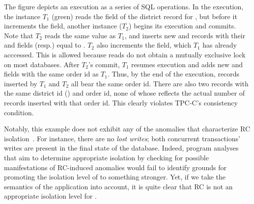 
The figure depicts an execution as a series of SQL 
operations. In the execution, the  instance
$T_1$ (green) reads the  field of the district
record for , but before it increments the field, another
 instance ($T_2$) begins its execution and commits. Note
that $T_2$ reads the same  value as $T_1$, and
inserts new  and  records with their 
and  fields (resp.) equal to . $T_2$
also increments the  field, which $T_1$ has already
acccessed. This is allowed because reads do not obtain a mutually
exclusive lock on most databases. After $T_2$'s commit, $T_1$ resumes
execution and adds new  and  fields with the
same order id as $T_1$. Thus, by the end of the execution,
 records inserted by $T_1$ and $T_2$ all bear the same
order id. There are also two  records with the same district
id () and order id, none of whose  reflects the
actual number of  records inserted with that order id.
This clearly violates TPC-C's consistency condition. 

Notably, this example does not exhibit any of the anomalies that
characterize RC isolation~\cite{berenson}. For instance, there are no
\emph{lost writes}; both concurrent transactions' writes are present
in the final state of the database. Indeed, program analyses that aim
to determine appropriate isolation by checking for possible
manifestations of RC-induced anomalies would fail to identify grounds
for promoting the isolation level of  to something
stronger.  Yet, if we take the semantics of the application into
account, it is quite clear that RC is not an appropriate isolation
level for .

